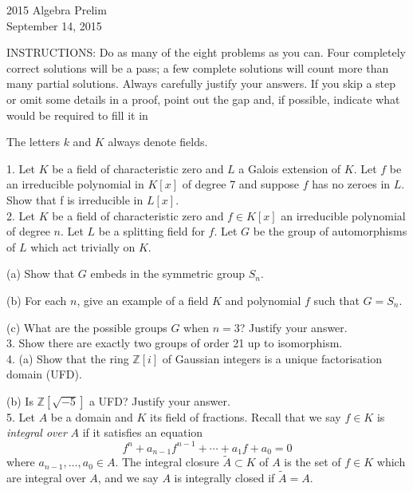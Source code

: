 \documentclass[11pt]{article}
\newcommand{\Z}{\mathbb{Z}}
\begin{document}
\begin{center}
\Large 2015 Algebra Prelim\\
\normalsize September 14, 2015
\end{center}
\vspace{1em}

INSTRUCTIONS: Do as many of the eight problems as you can. Four completely
correct solutions will be a pass; a few complete solutions will count more than many
partial solutions. Always carefully justify your answers. If you skip a step or omit
some details in a proof, point out the gap and, if possible, indicate what would be
required to fill it in\\
\vspace{1em}

The letters $k$ and $K$ always denote fields.

1. Let $K$ be a field of characteristic zero and $L$ a Galois extension of $K$.
Let $f$ be an irreducible polynomial in $K[x]$ of degree 7 and suppose $f$
has no zeroes in $L$. Show that f is irreducible in $L[x]$.\\

2. Let $K$ be a field of characteristic zero and $f \in K[x]$ an irreducible
polynomial of degree $n$. Let $L$ be a splitting field for $f$. Let $G$ be the
group of automorphisms of $L$ which act trivially on $K$.

(a) Show that $G$ embeds in the symmetric group $S_n$.

(b) For each $n$, give an example of a field $K$ and polynomial $f$ such
that $G = S_n$.

(c) What are the possible groups $G$ when $n = 3$? Justify your answer.\\

3. Show there are exactly two groups of order 21 up to isomorphism.\\

4. (a) Show that the ring $\Z[i]$ of Gaussian integers is a unique factorisation
domain (UFD).

(b) Is $\Z[\sqrt{-5}]$ a UFD? Justify your answer.\\

5. Let $A$ be a domain and $K$ its field of fractions. Recall that we say
$f \in K$ is \emph{integral over} $A$ if it satisfies an equation\[
f^n + a_{n-1}f^{n-1} +\cdots + a_1f + a_0 = 0
\]
where $a_{n-1},\ldots,a_0\in A$.  The integral closure $\tilde A \subset K$  of $A$ is the set of
$f\in K$ which are integral over $A$, and we say $A$ is integrally closed if
$\tilde A = A$.
\end{document}
